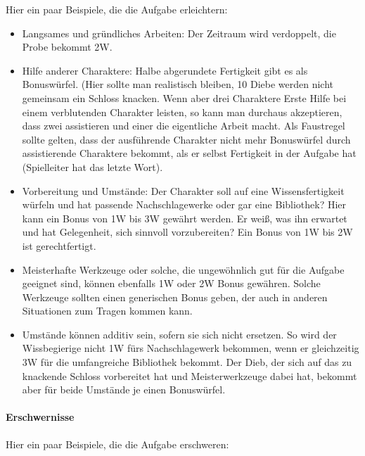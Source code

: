 \documentclass{article}
\begin{document}
Hier ein paar Beispiele, die die Aufgabe erleichtern:

\begin{itemize}
\item Langsames und gründliches Arbeiten: Der Zeitraum wird verdoppelt, die Probe bekommt 2W.
\item Hilfe anderer Charaktere: Halbe abgerundete Fertigkeit gibt es als Bonuswürfel. (Hier sollte man realistisch bleiben, 10 Diebe werden nicht gemeinsam ein Schloss knacken. Wenn aber drei Charaktere Erste Hilfe bei einem verblutenden Charakter leisten, so kann man durchaus akzeptieren, dass zwei assistieren und einer die eigentliche Arbeit macht. Als Faustregel sollte gelten, dass der ausführende Charakter nicht mehr Bonuswürfel durch assistierende Charaktere bekommt, als er selbst Fertigkeit in der Aufgabe hat (Spielleiter hat das letzte Wort).
\item Vorbereitung und Umstände: Der Charakter soll auf eine Wissensfertigkeit würfeln und hat passende Nachschlagewerke oder gar eine Bibliothek? Hier kann ein Bonus von 1W bis 3W gewährt werden. Er weiß, was ihn erwartet und hat Gelegenheit, sich sinnvoll vorzubereiten? Ein Bonus von 1W bis 2W ist gerechtfertigt.
\item Meisterhafte Werkzeuge oder solche, die ungewöhnlich gut für die Aufgabe geeignet sind, können ebenfalls 1W oder 2W Bonus gewähren. Solche Werkzeuge sollten einen generischen Bonus geben, der auch in anderen Situationen zum Tragen kommen kann. 
\item Umstände können additiv sein, sofern sie sich nicht ersetzen. So wird der Wissbegierige nicht 1W fürs Nachschlagewerk bekommen, wenn er gleichzeitig 3W für die umfangreiche Bibliothek bekommt. Der Dieb, der sich auf das zu knackende Schloss vorbereitet hat und Meisterwerkzeuge dabei hat, bekommt aber für beide Umstände je einen Bonuswürfel.
\end{itemize}

\paragraph{Erschwernisse}

Hier ein paar Beispiele, die die Aufgabe erschweren:
\end{document}
